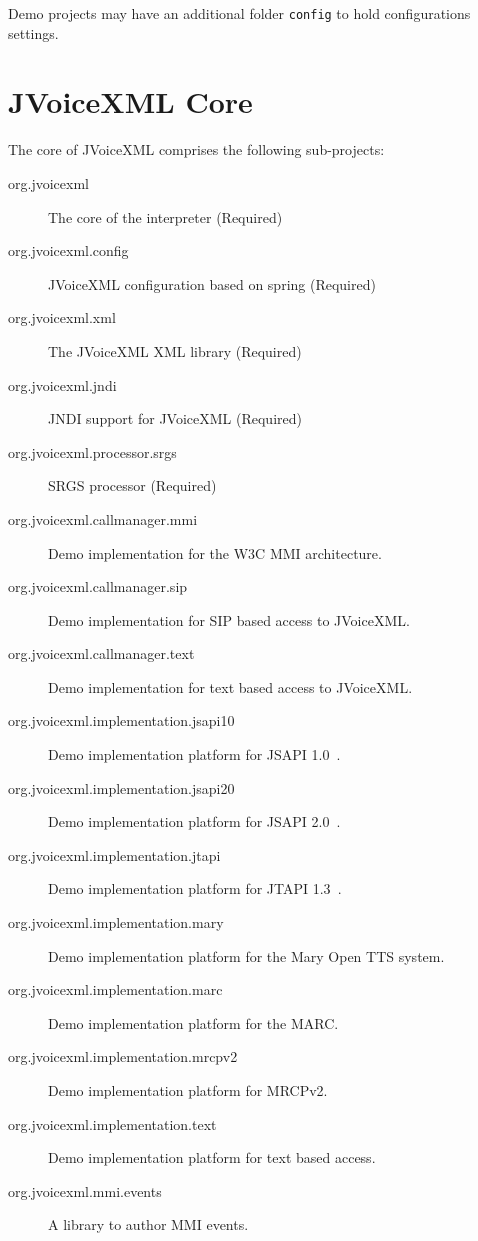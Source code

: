 \documentclass[11pt,a4paper]{article}
\begin{document}
Demo projects may have an additional folder \texttt{config} to hold
configurations settings. 

\section{JVoiceXML Core}

The core of JVoiceXML comprises the following sub-projects:

\begin{description}
\item[org.jvoicexml] The core of the interpreter (Required)
\item[org.jvoicexml.config] JVoiceXML configuration based on spring (Required)
\item[org.jvoicexml.xml] The JVoiceXML XML library (Required)
\item[org.jvoicexml.jndi] JNDI support for JVoiceXML (Required)
\item[org.jvoicexml.processor.srgs] SRGS processor (Required)
\item[org.jvoicexml.callmanager.mmi] Demo implementation for the W3C MMI
architecture.
\item[org.jvoicexml.callmanager.sip] Demo implementation for SIP based access to
JVoiceXML.
\item[org.jvoicexml.callmanager.text] Demo implementation for text based access to
JVoiceXML.
\item[org.jvoicexml.implementation.jsapi10] Demo implementation platform for
JSAPI 1.0~\cite{sun:jsapi}.
\item[org.jvoicexml.implementation.jsapi20] Demo implementation platform for
JSAPI 2.0~\cite{jcp:jsr113}.
\item[org.jvoicexml.implementation.jtapi] Demo implementation platform for
JTAPI 1.3~\cite{sun:jtapi}.
\item[org.jvoicexml.implementation.mary] Demo implementation platform for
the Mary Open TTS system.
\item[org.jvoicexml.implementation.marc] Demo implementation platform for
the MARC.
\item[org.jvoicexml.implementation.mrcpv2] Demo implementation platform for
MRCPv2.
\item[org.jvoicexml.implementation.text] Demo implementation platform for
text based access.
\item[org.jvoicexml.mmi.events] A library to author MMI events.
\end{description}
\end{document}
